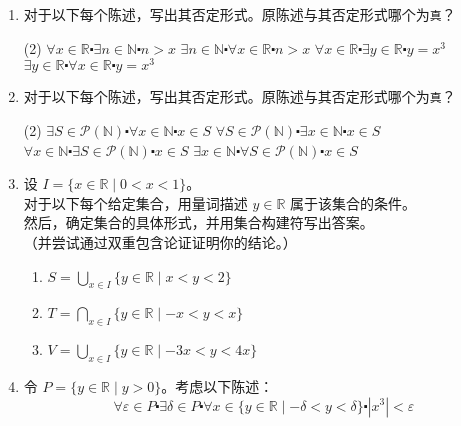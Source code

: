 \begin{enumerate}[label=(\arabic*)]
    \item 对于以下每个陈述，写出其否定形式。原陈述与其否定形式哪个为\verb|真|？
        \begin{tasks}[label=(\alph*)](2)
            \task $\forall x \in \mathbb{R} \centerdot \exists n \in \mathbb{N} \centerdot n > x$
            \task $\exists n \in \mathbb{N} \centerdot \forall x \in \mathbb{R} \centerdot n > x$
            \task $\forall x \in \mathbb{R} \centerdot \exists y \in \mathbb{R} \centerdot y = x^3$
            \task $\exists y \in \mathbb{R} \centerdot \forall x \in \mathbb{R} \centerdot y = x^3$
        \end{tasks}
    \item 对于以下每个陈述，写出其否定形式。原陈述与其否定形式哪个为\verb|真|？
        \begin{tasks}[label=(\alph*)](2)
            \task $\exists S \in \mathcal{P}(\mathbb{N}) \centerdot \forall x \in \mathbb{N} \centerdot x \in S$
            \task $\forall S \in \mathcal{P}(\mathbb{N}) \centerdot \exists x \in \mathbb{N} \centerdot x \in S$
            \task $\forall x \in \mathbb{N} \centerdot \exists S \in \mathcal{P}(\mathbb{N}) \centerdot x \in S$
            \task $\exists x \in \mathbb{N} \centerdot \forall S \in \mathcal{P}(\mathbb{N}) \centerdot x \in S$
        \end{tasks}
    \item 设 $I = \{x \in \mathbb{R} \mid 0 < x < 1\}$。\\
        对于以下每个给定集合，用量词描述 $y \in \mathbb{R}$ 属于该集合的条件。\\
        然后，确定集合的具体形式，并用集合构建符写出答案。\\
        （并尝试通过双重包含论证证明你的结论。）
        \begin{enumerate}[label=(\alph*)]
            \item $\displaystyle{S =\bigcup_{x \in I}\{y \in \mathbb{R} \mid x < y < 2\}}$
            \item $\displaystyle{T =\bigcap_{x \in I}\{y \in \mathbb{R} \mid -x < y < x\}}$
            \item $\displaystyle{V =\bigcup_{x \in I}\{y \in \mathbb{R} \mid -3x < y < 4x\}}$
        \end{enumerate}
    \item 令 $P = \{y \in \mathbb{R} \mid y > 0\}$。考虑以下陈述：
        \[\forall \varepsilon \in P \centerdot \exists \delta \in P \centerdot \forall x \in \{y \in \mathbb{R} \mid -\delta < y < \delta\} \centerdot |x^3| < \varepsilon\]

\end{enumerate}
